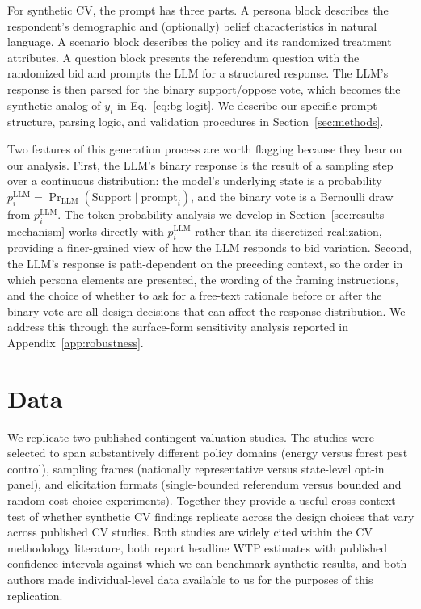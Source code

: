 \documentclass[12pt]{article}
\begin{document}
For synthetic CV, the prompt has three parts. A persona block describes the respondent's demographic and (optionally) belief characteristics in natural language. A scenario block describes the policy and its randomized treatment attributes. A question block presents the referendum question with the randomized bid and prompts the LLM for a structured response. The LLM's response is then parsed for the binary support/oppose vote, which becomes the synthetic analog of $y_i$ in Eq.~\ref{eq:bg-logit}. We describe our specific prompt structure, parsing logic, and validation procedures in Section~\ref{sec:methods}.

Two features of this generation process are worth flagging because they bear on our analysis. First, the LLM's binary response is the result of a sampling step over a continuous distribution: the model's underlying state is a probability $p_i^{\text{LLM}} = \Pr_{\text{LLM}}(\text{Support} \mid \text{prompt}_i)$, and the binary vote is a Bernoulli draw from $p_i^{\text{LLM}}$. The token-probability analysis we develop in Section~\ref{sec:results-mechanism} works directly with $p_i^{\text{LLM}}$ rather than its discretized realization, providing a finer-grained view of how the LLM responds to bid variation. Second, the LLM's response is path-dependent on the preceding context, so the order in which persona elements are presented, the wording of the framing instructions, and the choice of whether to ask for a free-text rationale before or after the binary vote are all design decisions that can affect the response distribution. We address this through the surface-form sensitivity analysis reported in Appendix~\ref{app:robustness}.

%

\section{Data}\label{sec:data}

We replicate two published contingent valuation studies. The studies were selected to span substantively different policy domains (energy versus forest pest control), sampling frames (nationally representative versus state-level opt-in panel), and elicitation formats (single-bounded referendum versus bounded and random-cost choice experiments). Together they provide a useful cross-context test of whether synthetic CV findings replicate across the design choices that vary across published CV studies. Both studies are widely cited within the CV methodology literature, both report headline WTP estimates with published confidence intervals against which we can benchmark synthetic results, and both authors made individual-level data available to us for the purposes of this replication.
\end{document}
